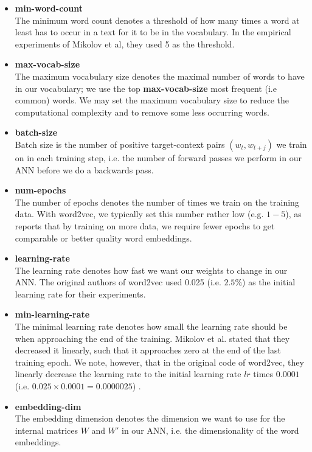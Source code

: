 \begin{itemize}
    \item \textbf{min-word-count} \\
        The minimum word count denotes a threshold of how many times a word at least has to occur in a text for it to be in the vocabulary. In the empirical experiments of Mikolov et al, they used 5 as the threshold.
    \item \textbf{max-vocab-size} \\
        The maximum vocabulary size denotes the maximal number of words to have in our vocabulary; we use the top \textbf{max-vocab-size} most frequent (i.e common) words. We may set the maximum vocabulary size to reduce the computational complexity and to remove some less occurring words.
    \item \textbf{batch-size} \\
        Batch size is the number of positive target-context pairs $(w_t, w_{t+j})$ we train on in each training step, i.e. the number of forward passes we perform in our ANN before we do a backwards pass.
    \item \textbf{num-epochs} \\
        The number of epochs denotes the number of times we train on the training data. With word2vec, we typically set this number rather low (e.g. $1-5$), as \cite{mikolov2013a} reports that by training on more data, we require fewer epochs to get comparable or better quality word embeddings.
    \item \textbf{learning-rate} \\
        The learning rate denotes how fast we want our weights to change in our ANN. The original authors of word2vec used 0.025 (i.e. $2.5\%$) as the initial learning rate for their experiments.
    \item \textbf{min-learning-rate} \\
        The minimal learning rate denotes how small the learning rate should be when approaching the end of the training. Mikolov et al. stated that they decreased it linearly, such that it approaches zero at the end of the last training epoch. We note, however, that in the original code of word2vec, they linearly decrease the learning rate to the initial learning rate $lr$ times $0.0001$ (i.e. $0.025 \times 0.0001 = 0.0000025$) \cite[line 398]{Word2vecCCode}.
    \item \textbf{embedding-dim} \\
        The embedding dimension denotes the dimension we want to use for the internal matrices $W$ and $W'$ in our ANN, i.e. the dimensionality of the word embeddings.

\end{itemize}
